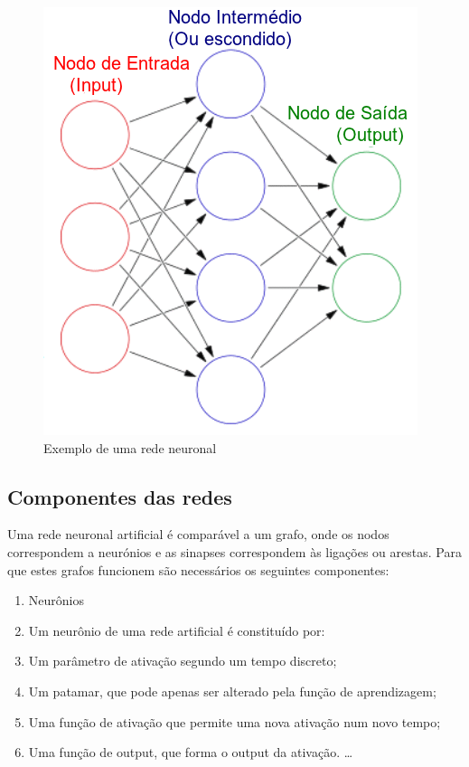 \begin{figure}[H]
    \centering
    \includegraphics[scale=0.3]{img/ann1.png}
    \caption{Exemplo de uma rede neuronal}
    \label{fig:Rede Neuronal}
\end{figure}

\subsection{Componentes das redes}

Uma rede neuronal artificial é comparável a um grafo, onde os nodos correspondem a neurónios e as sinapses correspondem às ligações ou arestas. Para que estes grafos funcionem são necessários os seguintes componentes:

\begin{enumerate}  
\item Neurônios
\item Um neurônio de uma rede artificial é constituído por:
\item Um parâmetro de ativação segundo um tempo discreto;
\item Um patamar, que pode apenas ser alterado pela função de aprendizagem;
\item Uma função de ativação que permite uma nova ativação num novo tempo;
\item Uma função de output, que forma o output da ativação. \ldots 
\end{enumerate}
 
